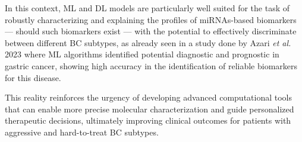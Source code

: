 In this context, \gls{ML} and \gls{DL} models are particularly well suited for the task of robustly characterizing and 
explaining the profiles of \gls{miRNAs}-based biomarkers — should such biomarkers exist — with the potential to effectively 
discriminate between different \gls{BC} subtypes, as already seen in a study done by  \cite{ml_gastric_Azari2023} Azari \textit{et al.} 2023 where \gls{ML} 
algorithms identified potential diagnostic and prognostic  in gastric cancer, showing high accuracy in the 
identification of reliable biomarkers for this disease.

This reality reinforces the urgency of developing advanced computational tools that can enable more precise molecular 
characterization and guide personalized therapeutic decisions, ultimately improving clinical outcomes for patients with 
aggressive and hard-to-treat \gls{BC} subtypes.
